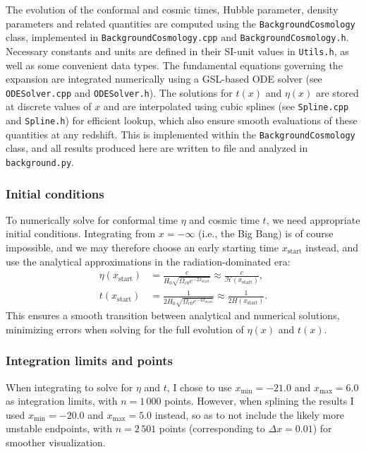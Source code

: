 \documentclass{aa}
\numberwithin{equation}{section}
\numberwithin{table}{section}
\numberwithin{figure}{section}
\begin{document}
The evolution of the conformal and cosmic times, Hubble parameter, density parameters and related quantities are computed using the \verb|BackgroundCosmology| class, implemented in \verb|BackgroundCosmology.cpp| and \verb|BackgroundCosmology.h|. Necessary constants and units are defined in their SI-unit values in \verb|Utils.h|, as well as some convenient data types. The fundamental equations governing the expansion are integrated numerically using a GSL-based ODE solver (see \verb|ODESolver.cpp| and \verb|ODESolver.h|). The solutions for $t(x)$ and $\eta(x)$ are stored at discrete values of $x$ and are interpolated using cubic splines (see \verb|Spline.cpp| and \verb|Spline.h|) for efficient lookup, which also ensure smooth evaluations of these quantities at any redshift. This is implemented within the \verb|BackgroundCosmology| class, and all results produced here are written to file and analyzed in \verb|background.py|. 

\subsubsection{Initial conditions}\label{subsubsec: I method initial}
To numerically solve for conformal time $\eta$ and cosmic time $t$, we need appropriate initial conditions. Integrating from $x = -\infty$ (i.e., the Big Bang) is of course impossible, and we may therefore choose an early starting time $x_{\text{start}}$ instead, and use the analytical approximations in the radiation-dominated era:
\begin{align}
  \eta(x_{\text{start}}) &= \frac{c}{H_0\sqrt{\Omega_{r0}e^{-2x_\text{start}}}} \approx \frac{c}{\mathcal{H}(x_{\text{start}})},
  \\
  t(x_{\text{start}}) &= \frac{1}{2H_0\sqrt{\Omega_{r0}e^{-4x_\text{start}}}} \approx \frac{1}{2H(x_{\text{start}})}.
\end{align}
This ensures a smooth transition between analytical and numerical solutions, minimizing errors when solving for the full evolution of $\eta(x)$ and $t(x)$.


\subsubsection{Integration limits and points}
When integrating to solve for $\eta$ and $t$, I chose to use $x_\text{min}=-21.0$ and $x_\text{max}=6.0$ as integration limits, with $n=1\,000$ points. However, when splining the results I used $x_\text{min}=-20.0$ and $x_\text{max}=5.0$ instead, so as to not include the likely more unstable endpoints, with $n=2\,501$ points (corresponding to $\Delta x = 0.01$) for smoother visualization.
\end{document}
